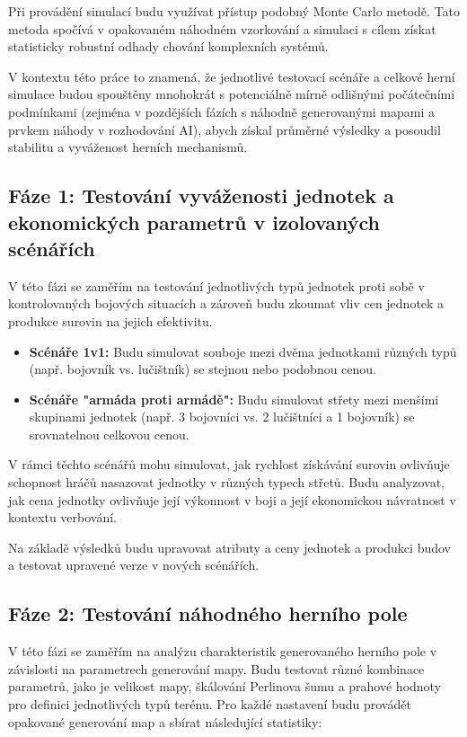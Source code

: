 Při provádění simulací budu využívat přístup podobný Monte Carlo metodě. Tato metoda spočívá v opakovaném náhodném vzorkování a simulaci s cílem získat statisticky robustní odhady chování komplexních systémů. 

V kontextu této práce to znamená, že jednotlivé testovací scénáře a celkové herní simulace budou spouštěny mnohokrát s potenciálně mírně odlišnými počátečními podmínkami (zejména v pozdějších fázích s náhodně generovanými mapami a prvkem náhody v rozhodování AI), abych získal průměrné výsledky a posoudil stabilitu a vyváženost herních mechanismů.

\subsection{Fáze 1: Testování vyváženosti jednotek a ekonomických parametrů v izolovaných scénářích}

V této fázi se zaměřím na testování jednotlivých typů jednotek proti sobě v kontrolovaných bojových situacích a zároveň budu zkoumat vliv cen jednotek a produkce surovin na jejich efektivitu.

\begin{itemize}
    \item \textbf{Scénáře 1v1:} Budu simulovat souboje mezi dvěma jednotkami různých typů (např. bojovník vs. lučištník) se stejnou nebo podobnou cenou.
    \item \textbf{Scénáře "armáda proti armádě":} Budu simulovat střety mezi menšími skupinami jednotek (např. 3 bojovníci vs. 2 lučištníci a 1 bojovník) se srovnatelnou celkovou cenou.
\end{itemize}

V rámci těchto scénářů mohu simulovat, jak rychlost získávání surovin ovlivňuje schopnost hráčů nasazovat jednotky v různých typech střetů.
Budu analyzovat, jak cena jednotky ovlivňuje její výkonnost v boji a její ekonomickou návratnost v kontextu verbování.

Na základě výsledků budu upravovat atributy a ceny jednotek a produkci budov a testovat upravené verze v nových scénářích.

\subsection{Fáze 2: Testování náhodného herního pole}

V této fázi se zaměřím na analýzu charakteristik generovaného herního pole v závislosti na parametrech generování mapy. Budu testovat různé kombinace parametrů, jako je velikost mapy, škálování Perlinova šumu a prahové hodnoty pro definici jednotlivých typů terénu. Pro každé nastavení budu provádět opakované generování map a sbírat následující statistiky:

